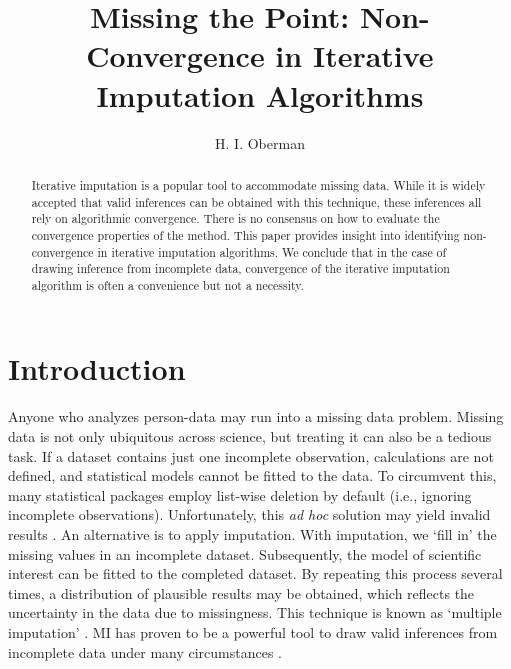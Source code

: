 \documentclass[Royal,times,sageh]{sagej}
\begin{document}
\title{Missing the Point: Non-Convergence in Iterative Imputation Algorithms}


\author{H. I. Oberman}




\begin{abstract}
Iterative imputation is a popular tool to accommodate missing data. While it is widely accepted that valid inferences can be obtained with this technique, these inferences all rely on algorithmic convergence. There is no consensus on how to evaluate the convergence properties of the method. This paper provides insight into identifying non-convergence in iterative imputation algorithms. We conclude that in the case of drawing inference from incomplete data, convergence of the iterative imputation algorithm is often a convenience but not a necessity.
\end{abstract}


\maketitle

\hypertarget{introduction}{%
\section{Introduction}\label{introduction}}

Anyone who analyzes person-data may run into a missing data problem. Missing data is not only ubiquitous across science, but treating it can also be a tedious task. If a dataset contains just one incomplete observation, calculations are not defined, and statistical models cannot be fitted to the data. To circumvent this, many statistical packages employ list-wise deletion by default (i.e., ignoring incomplete observations). Unfortunately, this \emph{ad hoc} solution may yield invalid results \citep{buur18}. An alternative is to apply imputation. With imputation, we `fill in' the missing values in an incomplete dataset. Subsequently, the model of scientific interest can be fitted to the completed dataset. By repeating this process several times, a distribution of plausible results may be obtained, which reflects the uncertainty in the data due to missingness. This technique is known as `multiple imputation' \citep[MI;][]{rubin76}. MI has proven to be a powerful tool to draw valid inferences from incomplete data under many circumstances \citep{buur18}.
\end{document}
